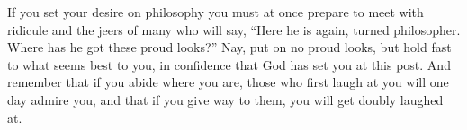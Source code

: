 If you  set your desire  on philosophy  you must at  once prepare to  meet with
ridicule  and the  jeers of  many  who will  say,  ``Here he  is again,  turned
philosopher. Where has he got these proud  looks?'' Nay, put on no proud looks,
but hold fast to what seems best to  you, in confidence that God has set you at
this post. And remember that if you  abide where you are, those who first laugh
at you will one day admire you, and that  if you give way to them, you will get
doubly laughed at.
